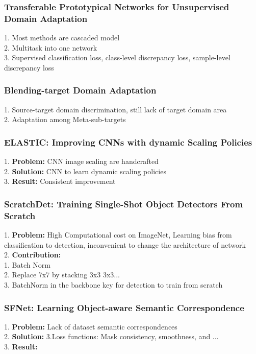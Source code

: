 \subsubsection{Transferable Prototypical Networks for Unsupervised Domain Adaptation}
    1. Most methods are cascaded model \\
    2. Multitask into one network \\
    3. Supervised classification loss, class-level discrepancy loss, sample-level discrepancy loss \\
\subsubsection{Blending-target Domain Adaptation}
    1. Source-target domain discrimination, still lack of target domain area \\
    2. Adaptation among Meta-sub-targets \\
\subsubsection{ELASTIC: Improving CNNs with dynamic Scaling Policies}
    1. {\bf Problem:} CNN image scaling are handcrafted \\
    2. {\bf Solution:} CNN to learn dynamic scaling policies \\
    3. {\bf Result:} Consistent improvement \\
\subsubsection{ScratchDet: Training Single-Shot Object Detectors From Scratch}
    1. {\bf Problem:} High Computational cost on ImageNet, Learning bias from classification to detection, inconvenient to change the architecture of network \\
    2. {\bf Contribution:}  \\
        1. Batch Norm \\
        2. Replace 7x7 by stacking 3x3 3x3... \\
        3. BatchNorm in the backbone key for detection to train from scratch \\
\subsubsection{SFNet: Learning Object-aware Semantic Correspondence}
    1. {\bf Problem:} Lack of dataset semantic correspondences \\
    2. {\bf Solution:} 3.Loss functions: Mask consistency, smoothness, and ... \\
    3. {\bf Result:}  \\
